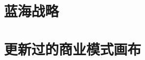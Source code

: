\documentclass[a4paper,12pt]{article}
\begin{document}
\section{蓝海战略}
    

\section{更新过的商业模式画布}


    
\end{document}
